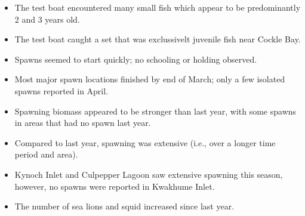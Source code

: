 \begin{itemize}
\item The test boat encountered many small fish which appear to be predominantly 2 and 3 years old.
\item The test boat caught a set that was exclussivelt juvenile fish near Cockle Bay.
\item Spawns seemed to start quickly; no schooling or holding observed.
\item Most major spawn locations finished by end of March; only a few isolated spawns reported in April.
\item Spawning biomass appeared to be stronger than last year, with some spawns in areas that had no spawn last year.
\item Compared to last year, spawning was extensive (i.e., over a longer time period and area).
\item Kynoch Inlet and Culpepper Lagoon saw extensive spawning this season, however, no spawns were reported in Kwakhume Inlet.
\item The number of sea lions and squid increased since last year.
\end{itemize}